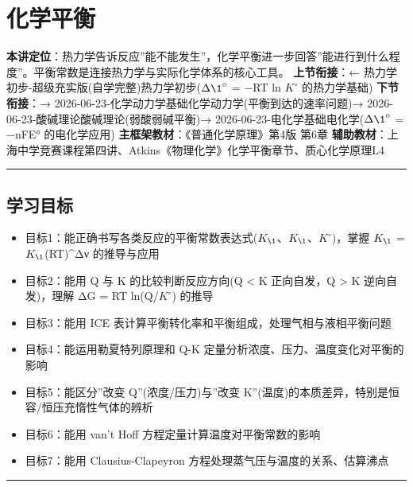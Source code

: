 \section{化学平衡}\label{ux5316ux5b66ux5e73ux8861}

\textbf{本讲定位}：热力学告诉反应''能不能发生''，化学平衡进一步回答''能进行到什么程度''。平衡常数是连接热力学与实际化学体系的核心工具。
\textbf{上节衔接}：← 热力学初步-超级充实版(自学完整)\textbar 热力学初步(\(\Delta \1^{\circ}\) = −RT ln \(K^{\circ}\) 的热力学基础)
\textbf{下节衔接}：→ 2026-06-23-化学动力学基础\textbar 化学动力学(平衡到达的速率问题)→ 2026-06-23-酸碱理论\textbar 酸碱理论(弱酸弱碱平衡)→ 2026-06-23-电化学基础\textbar 电化学(\(\Delta \1^{\circ}\) = −nFE° 的电化学应用)
\textbf{主框架教材}：《普通化学原理》第4版 第6章
\textbf{辅助教材}：上海中学竞赛课程第四讲、Atkins《物理化学》化学平衡章节、质心化学原理L4

\begin{center}\rule{0.5\linewidth}{0.5pt}\end{center}

\subsection{学习目标}\label{ux5b66ux4e60ux76eeux6807}

\begin{itemize}
\tightlist
\item
  目标1：能正确书写各类反应的平衡常数表达式(\(K_{\1}\)、\(K_{\1}\)、\(K^{\circ}\))，掌握 \(K_{\1}\) = \(K_{\1}\)(RT)\^{}Δν 的推导与应用
\item
  目标2：能用 Q 与 K 的比较判断反应方向(Q \textless{} K 正向自发，Q \textgreater{} K 逆向自发)，理解 ΔG = RT ln(Q/\(K^{\circ}\)) 的推导
\item
  目标3：能用 ICE 表计算平衡转化率和平衡组成，处理气相与液相平衡问题
\item
  目标4：能运用勒夏特列原理和 Q-K 定量分析浓度、压力、温度变化对平衡的影响
\item
  目标5：能区分''改变 Q''(浓度/压力)与''改变 K''(温度)的本质差异，特别是恒容/恒压充惰性气体的辨析
\item
  目标6：能用 van't Hoff 方程定量计算温度对平衡常数的影响
\item
  目标7：能用 Clausius-Clapeyron 方程处理蒸气压与温度的关系、估算沸点
\end{itemize}

\begin{center}\rule{0.5\linewidth}{0.5pt}\end{center}

